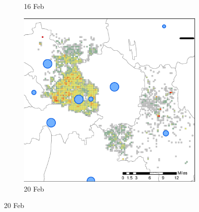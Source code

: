 \documentclass[preprints,ijgi,submit,moreauthors]{Definitions/mdpi}
\begin{document}
\begin{figure}[H]
\begin{subfigure}{.3\textwidth}
        \caption{16 Feb}
    \end{subfigure}
    \begin{subfigure}{.3\textwidth}
        \includegraphics[width=\textwidth]{Figures/Figure7/NewDistrictSSBD2020_02_20.eps}
        \caption{20 Feb}
    \end{subfigure}
    

\end{figure}
\end{document}
